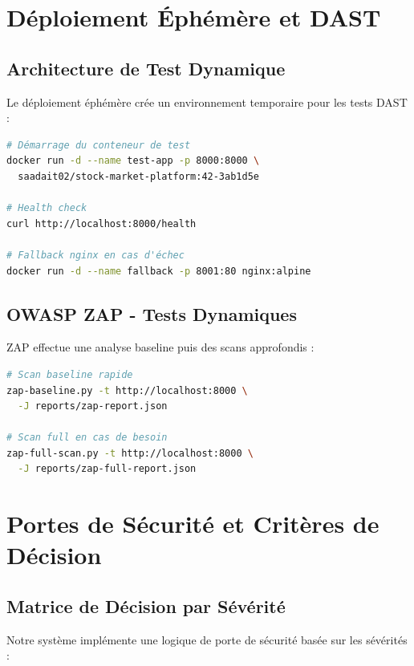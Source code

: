 \documentclass[12pt,a4paper]{report}
\begin{document}
\section{Déploiement Éphémère et DAST}

\subsection{Architecture de Test Dynamique}

Le déploiement éphémère crée un environnement temporaire pour les tests DAST :

\begin{lstlisting}[language=bash]
# Démarrage du conteneur de test
docker run -d --name test-app -p 8000:8000 \
  saadait02/stock-market-platform:42-3ab1d5e

# Health check
curl http://localhost:8000/health

# Fallback nginx en cas d'échec
docker run -d --name fallback -p 8001:80 nginx:alpine
\end{lstlisting}

\subsection{OWASP ZAP - Tests Dynamiques}

ZAP effectue une analyse baseline puis des scans approfondis :

\begin{lstlisting}[language=bash]
# Scan baseline rapide
zap-baseline.py -t http://localhost:8000 \
  -J reports/zap-report.json

# Scan full en cas de besoin
zap-full-scan.py -t http://localhost:8000 \
  -J reports/zap-full-report.json
\end{lstlisting}

\section{Portes de Sécurité et Critères de Décision}

\subsection{Matrice de Décision par Sévérité}

Notre système implémente une logique de porte de sécurité basée sur les sévérités :
\end{document}

